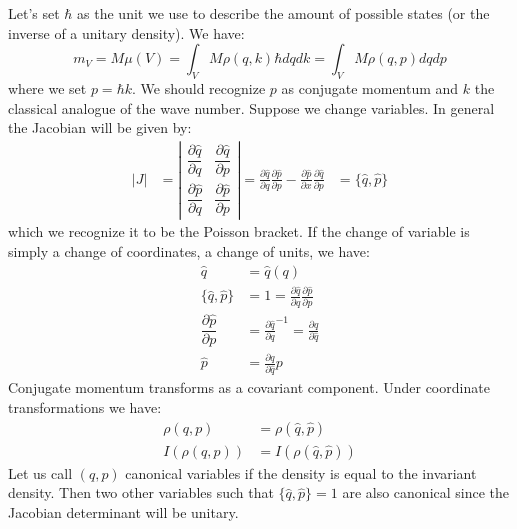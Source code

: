 \documentclass[11pt]{article}
\begin{document}
Let's set $\hbar$ as the unit we use to describe the amount of possible states (or the inverse of a unitary density). We have:
\begin{equation}
m_V = M \mu(V) =\int_V M \rho(q, k) \hbar dq dk = \int_V M \rho(q, p) dq dp
\end{equation}
where we set $p=\hbar k$. We should recognize $p$ as conjugate momentum and $k$ the classical analogue of the wave number. Suppose we change variables. In general the Jacobian will be given by:
\begin{equation}
\label{Poisson}
\begin{aligned}
|J| &= \left| \begin{matrix}
\dfrac{\partial \hat{q}}{\partial q} & \dfrac{\partial \hat{q}}{\partial p} \\[2.2ex]
\dfrac{\partial \hat{p}}{\partial q} & \dfrac{\partial \hat{p}}{\partial p} \end{matrix} \right| = \frac{\partial \hat{q}}{\partial q} \frac{\partial \hat{p}}{\partial p} - \frac{\partial \hat{p}}{\partial x} \frac{\partial \hat{q}}{\partial p} &= \{\hat{q}, \hat{p}\}
\end{aligned}
\end{equation}
which we recognize it to be the Poisson bracket. If the change of variable is simply a change of coordinates, a change of units, we have:
\begin{equation}
\label{coordinate_change}
\begin{aligned}
\hat{q} &= \hat{q}(q) \\
\{\hat{q}, \hat{p}\} &= 1 = \frac{\partial \hat{q}}{\partial q} \frac{\partial \hat{p}}{\partial p} \\
\dfrac{\partial \hat{p}}{\partial p} &= \frac{\partial \hat{q}}{\partial q} ^{-1} = \frac{\partial q}{\partial \hat{q}} \\
\hat{p} &= \frac{\partial q}{\partial \hat{q}} p
\end{aligned}
\end{equation}
Conjugate momentum transforms as a covariant component. Under coordinate transformations we have:
\begin{equation}
\label{density_invariance}
\begin{aligned}
\rho(q,p) &= \rho(\hat{q}, \hat{p}) \\
I(\rho(q,p)) &= I(\rho(\hat{q},\hat{p}))
\end{aligned}
\end{equation}
Let us call $(q,p)$ canonical variables if the density is equal to the invariant density. Then two other variables such that $\{\hat{q}, \hat{p}\}=1$ are also canonical since the Jacobian determinant will be unitary.
\end{document}
